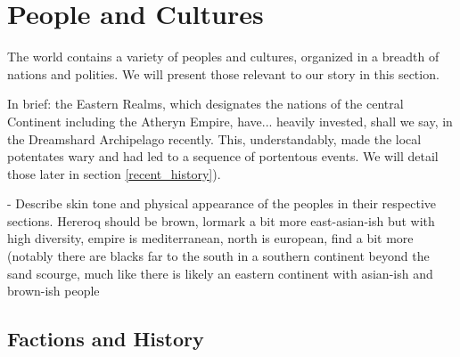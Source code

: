 \section{People and Cultures}

The world contains a variety of peoples and cultures, organized in a breadth of nations and polities. We will present those relevant to our story in this section.


In brief: the Eastern Realms, which designates the nations of the central Continent including the Atheryn Empire, have... heavily invested, shall we say, in the Dreamshard Archipelago recently. This, understandably, made the local potentates wary and had led to a sequence of portentous events. We will detail those later in section \ref{recent_history}).






- Describe skin tone and physical appearance of the peoples in their respective sections. Hereroq should be brown, lormark a bit more east-asian-ish but with high diversity, empire is mediterranean, north is european, find a bit more (notably there are blacks far to the south in a southern continent beyond the sand scourge, much like there is likely an eastern continent with asian-ish and brown-ish people







\subsection{Factions and History}

